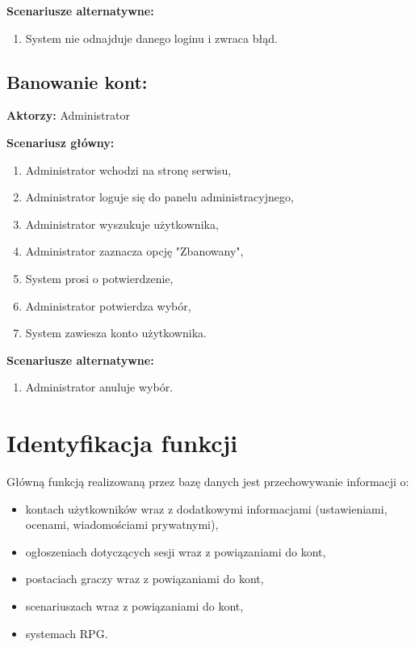 \textbf{Scenariusze alternatywne:}
	\begin{enumerate}
	\item System nie odnajduje danego loginu i zwraca błąd.
	\end{enumerate}

\subsection{Banowanie kont:}

\textbf{Aktorzy:} Administrator

\textbf{Scenariusz główny:}
	\begin{enumerate}
	\item Administrator wchodzi na stronę serwisu,
	\item Administrator loguje się do panelu administracyjnego,
	\item Administrator wyszukuje użytkownika,
	\item Administrator zaznacza opcję "Zbanowany",
	\item System prosi o potwierdzenie,
	\item Administrator potwierdza wybór,	
	\item System zawiesza konto użytkownika.
	\end{enumerate}

\textbf{Scenariusze alternatywne:}
	\begin{enumerate}
	\item Administrator anuluje wybór.
	\end{enumerate}


\section{Identyfikacja funkcji}
\label{sec:idfun}

Główną funkcją realizowaną przez bazę danych jest przechowywanie informacji o:
	\begin{itemize}
	\item kontach użytkowników wraz z dodatkowymi informacjami (ustawieniami, ocenami, wiadomościami prywatnymi),
	\item ogłoszeniach dotyczących sesji wraz z powiązaniami do kont,
	\item postaciach graczy wraz z powiązaniami do kont,
	\item scenariuszach wraz z powiązaniami do kont,
	\item systemach RPG.
	\end{itemize}

